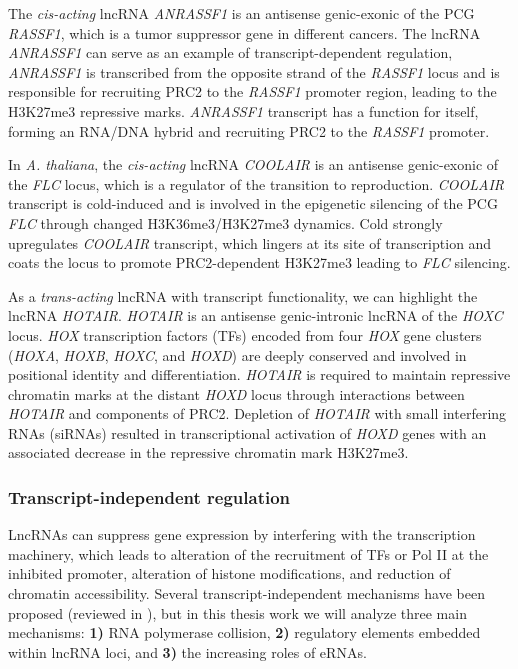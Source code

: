 The \textit{cis-acting} lncRNA \textit{ANRASSF1} is an antisense genic-exonic of the PCG \textit{RASSF1}, which is a tumor suppressor gene in different cancers. The lncRNA \textit{ANRASSF1} can serve as an example of transcript-dependent regulation, \textit{ANRASSF1} is transcribed from the opposite strand of the \textit{RASSF1} locus and is responsible for recruiting PRC2 to the \textit{RASSF1} promoter region, leading to the H3K27me3 repressive marks. \textit{ANRASSF1} transcript has a function for itself, forming an RNA/DNA hybrid and recruiting PRC2 to the \textit{RASSF1} promoter.\autocite{statello_2021_lncRNA_reg}

In \textit{A. thaliana}, the \textit{cis-acting} lncRNA \textit{COOLAIR} is an antisense genic-exonic of the \textit{FLC} locus, which is a regulator of the transition to reproduction. \textit{COOLAIR} transcript is cold-induced and is involved in the epigenetic silencing of the PCG \textit{FLC} through changed H3K36me3/H3K27me3 dynamics. Cold strongly upregulates \textit{COOLAIR} transcript, which lingers at its site of transcription and coats the locus to promote PRC2-dependent H3K27me3 leading to \textit{FLC} silencing.\autocite{statello_2021_lncRNA_reg}

As a \textit{trans-acting} lncRNA with transcript functionality, we can highlight the lncRNA \textit{HOTAIR}. \textit{HOTAIR} is an antisense genic-intronic lncRNA of the \textit{HOXC} locus. \textit{HOX} transcription factors (TFs) encoded from four \textit{HOX} gene clusters (\textit{HOXA}, \textit{HOXB}, \textit{HOXC}, and \textit{HOXD}) are deeply conserved and involved in positional identity and differentiation.\autocite{carnesecchi_2018_hox,statello_2021_lncRNA_reg} \textit{HOTAIR} is required to maintain repressive chromatin marks at the distant \textit{HOXD} locus through interactions between \textit{HOTAIR} and components of PRC2.\autocite{kopp_2018_functional,pelechano_2013}  Depletion of \textit{HOTAIR} with small interfering RNAs (siRNAs) resulted in transcriptional activation of \textit{HOXD} genes with an associated decrease in the repressive chromatin mark H3K27me3.\autocite{statello_2021_lncRNA_reg}

\subsubsection{Transcript-independent regulation}
\label{subsub-sec:trans-indep-reg}

LncRNAs can suppress gene expression by interfering with the transcription machinery, which leads to alteration of the recruitment of TFs or Pol II at the inhibited promoter, alteration of histone modifications, and reduction of chromatin accessibility. Several transcript-independent mechanisms have been proposed (reviewed in \autocite{statello_2021_lncRNA_reg,kopp_2018_functional,pelechano_2013}), but in this thesis work we will analyze three main mechanisms: \textbf{1)} RNA polymerase collision, \textbf{2)} regulatory elements embedded within lncRNA loci, and \textbf{3)} the increasing roles of eRNAs.  

